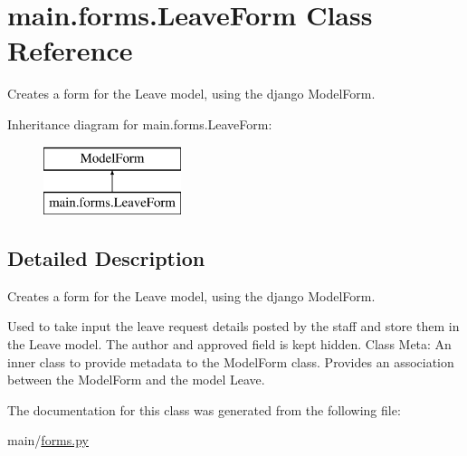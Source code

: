 \hypertarget{classmain_1_1forms_1_1LeaveForm}{}\section{main.\+forms.\+Leave\+Form Class Reference}
\label{classmain_1_1forms_1_1LeaveForm}


Creates a form for the Leave model, using the django Model\+Form.  


Inheritance diagram for main.\+forms.\+Leave\+Form\+:\begin{figure}[H]
\begin{center}
\leavevmode
\includegraphics[height=2.000000cm]{classmain_1_1forms_1_1LeaveForm}
\end{center}
\end{figure}


\subsection{Detailed Description}
Creates a form for the Leave model, using the django Model\+Form. 

Used to take input the leave request details posted by the staff and store them in the Leave model. The author and approved field is kept hidden. Class Meta\+: An inner class to provide metadata to the Model\+Form class. Provides an association between the Model\+Form and the model Leave. 

The documentation for this class was generated from the following file\+:\begin{DoxyCompactItemize}
\item 
main/\hyperlink{forms_8py}{forms.\+py}\end{DoxyCompactItemize}
